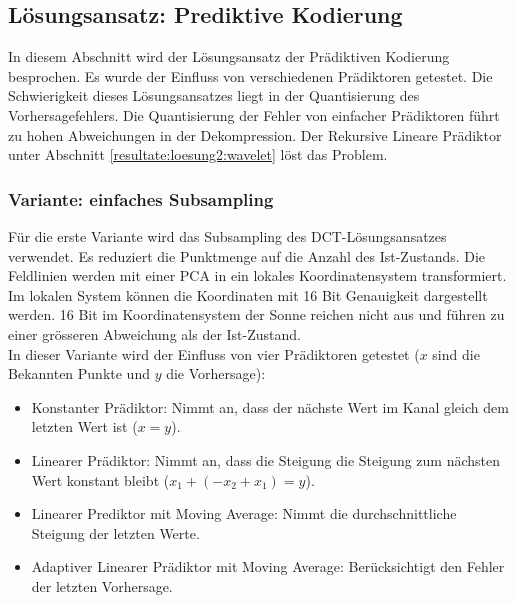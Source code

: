\subsection{Lösungsansatz: Prediktive Kodierung}
In diesem Abschnitt wird der Lösungsansatz der Prädiktiven Kodierung besprochen. Es wurde der Einfluss von verschiedenen Prädiktoren getestet. Die Schwierigkeit dieses Lösungsansatzes liegt in der Quantisierung des Vorhersagefehlers. Die Quantisierung der Fehler von einfacher Prädiktoren führt zu hohen Abweichungen in der Dekompression. Der Rekursive Lineare Prädiktor unter Abschnitt \ref{resultate:loesung2:wavelet} löst das Problem.

\subsubsection{Variante: einfaches Subsampling}
Für die erste Variante wird das Subsampling des DCT-Lösungsansatzes verwendet. Es reduziert die Punktmenge auf die Anzahl des Ist-Zustands. Die Feldlinien werden mit einer PCA in ein lokales Koordinatensystem transformiert. Im lokalen System können die Koordinaten mit 16 Bit Genauigkeit dargestellt werden. 16 Bit im Koordinatensystem der Sonne reichen nicht aus und führen zu einer grösseren Abweichung als der Ist-Zustand.\\
In dieser Variante wird der Einfluss von vier Prädiktoren getestet ($x$ sind die Bekannten Punkte und $y$ die Vorhersage):
\begin{itemize}
\item Konstanter Prädiktor: Nimmt an, dass der nächste Wert im Kanal gleich dem  letzten Wert ist ($x = y$).
\item Linearer Prädiktor: Nimmt an, dass die Steigung die Steigung zum nächsten Wert konstant bleibt ($x_1+(-x_2+x_1) = y$).
\item Linearer Prediktor mit Moving Average: Nimmt die durchschnittliche Steigung der letzten Werte.
\item Adaptiver Linearer Prädiktor mit Moving Average: Berücksichtigt den Fehler der letzten Vorhersage.
\end{itemize}

